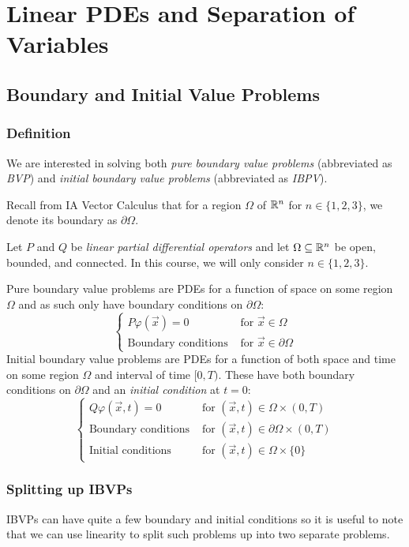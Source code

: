\documentclass[../main.tex]{subfiles}
\begin{document}
\chapter{Linear PDEs and Separation of Variables} \label{PDEChap}
\section{Boundary and Initial Value Problems}
\subsection{Definition}
We are interested in solving both \textit{pure boundary value problems} (abbreviated as \textit{BVP}) and \textit{initial boundary value problems} (abbreviated as \textit{IBPV}).

\begin{remark}[Recap]
  Recall from IA Vector Calculus that for a region $\Omega$ of $\mathbb{R}^n$ for $n \in \{1, 2, 3\}$, we denote its boundary as $\partial \Omega$.
\end{remark}
Let $P$ and $Q$ be \textit{linear partial differential operators} and let $\Omega \subseteq \mathbb{R}^n$ be open, bounded, and connected.
In this course, we will only consider $n \in \{1, 2, 3\}$.

Pure boundary value problems are PDEs for a function of space on some region $\Omega$ and as such only have boundary conditions on $\partial \Omega$:
\[
  \begin{cases}
  P\varphi(\vec{x}) = 0 & \text{ for } \vec{x} \in \Omega \\
  \text{Boundary conditions} & \text{ for } \vec{x} \in \partial \Omega
  \end{cases}
\]
Initial boundary value problems are PDEs for a function of both space and time on some region $\Omega$ and interval of time $[0, T)$.
These have both boundary conditions on $\partial \Omega$ and an \textit{initial condition} at $t = 0$:
\[
  \begin{cases}
  Q \varphi(\vec{x}, t) = 0 & \text{ for } (\vec{x}, t) \in \Omega \times (0, T) \\
  \text{Boundary conditions} & \text{ for } (\vec{x}, t) \in \partial \Omega \times (0, T) \\
  \text{Initial conditions} & \text{ for } (\vec{x}, t) \in \Omega \times \{0\}
  \end{cases}
\]

\subsection{Splitting up IBVPs}
IBVPs can have quite a few boundary and initial conditions so it is useful to note that we can use linearity to split such problems up into two separate problems.
\end{document}
